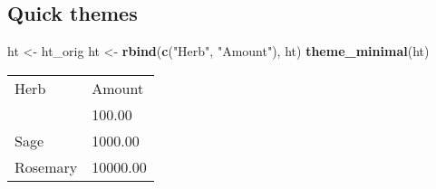 \documentclass[]{article}
\newenvironment{Shaded}{\begin{snugshade}}{\end{snugshade}}
\newcommand{\KeywordTok}[1]{\textcolor[rgb]{0.13,0.29,0.53}{\textbf{{#1}}}}
\newcommand{\StringTok}[1]{\textcolor[rgb]{0.31,0.60,0.02}{{#1}}}
\newcommand{\NormalTok}[1]{{#1}}
\begin{document}
\FloatBarrier

\subsection{Quick themes}\label{quick-themes}

\begin{Shaded}
\begin{Highlighting}[]
\NormalTok{ht <-}\StringTok{ }\NormalTok{ht_orig}
\NormalTok{ht <-}\StringTok{ }\KeywordTok{rbind}\NormalTok{(}\KeywordTok{c}\NormalTok{(}\StringTok{"Herb"}\NormalTok{, }\StringTok{"Amount"}\NormalTok{), ht)}
\KeywordTok{theme_minimal}\NormalTok{(ht)}
\end{Highlighting}
\end{Shaded}

\begin{table}[h]
\begin{centering}\begin{tabularx}{0.5\textwidth}{p{} p{}}
\multicolumn{1}{p{0.25\textwidth}|}{\raggedright\rule{0pt}{\baselineskip+4pt}\hspace*{4pt}Herb\hspace*{4pt}\rule[-4pt]{0pt}{4pt}} & \multicolumn{1}{p{0.25\textwidth}}{\raggedright\rule{0pt}{\baselineskip+4pt}\hspace*{4pt}Amount\hspace*{4pt}\rule[-4pt]{0pt}{4pt}} \tabularnewline[-0.5pt]
\hhline{>{\arrayrulecolor{black}}->{\arrayrulecolor{black}}-}
\arrayrulecolor{black}
\multicolumn{1}{p{0.25\textwidth}|}{\raggedright\rule{0pt}{\baselineskip+4pt}\hspace*{4pt}Parsley\hspace*{4pt}\rule[-4pt]{0pt}{4pt}} & \multicolumn{1}{p{0.25\textwidth}}{\raggedright\rule{0pt}{\baselineskip+4pt}\hspace*{4pt}100.00\hspace*{4pt}\rule[-4pt]{0pt}{4pt}} \tabularnewline[-0.5pt]
\multicolumn{1}{p{0.25\textwidth}|}{\raggedright\rule{0pt}{\baselineskip+4pt}\hspace*{4pt}Sage\hspace*{4pt}\rule[-4pt]{0pt}{4pt}} & \multicolumn{1}{p{0.25\textwidth}}{\raggedright\rule{0pt}{\baselineskip+4pt}\hspace*{4pt}1000.00\hspace*{4pt}\rule[-4pt]{0pt}{4pt}} \tabularnewline[-0.5pt]
\multicolumn{1}{p{0.25\textwidth}|}{\raggedright\rule{0pt}{\baselineskip+4pt}\hspace*{4pt}Rosemary\hspace*{4pt}\rule[-4pt]{0pt}{4pt}} & \multicolumn{1}{p{0.25\textwidth}}{\raggedright\rule{0pt}{\baselineskip+4pt}\hspace*{4pt}10000.00\hspace*{4pt}\rule[-4pt]{0pt}{4pt}} \tabularnewline[-0.5pt]

\end{tabularx}
\end{centering}
\end{table}
\end{document}
